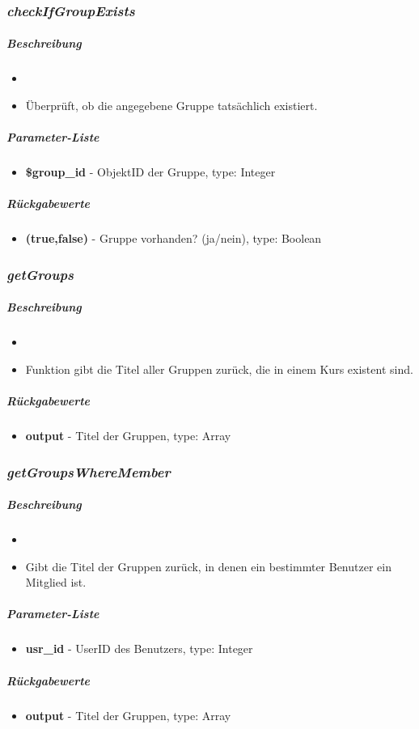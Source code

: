 \subsubsection*{\textit{checkIfGroupExists}}\label{checkIfGroupExistsMGUI}
\subparagraph{Beschreibung}
\begin{itemize}
	\item[] \noindent{} 
	\item[] Überprüft, ob die angegebene Gruppe tatsächlich existiert.
\end{itemize}
\subparagraph{Parameter-Liste}
\begin{itemize}
	\item[] \textbf{\$group\_id} - ObjektID der Gruppe, type: Integer
\end{itemize}
\subparagraph{Rückgabewerte}
\begin{itemize}
	\item[] \textbf{(true,false)} - Gruppe vorhanden? (ja/nein), type: Boolean
\end{itemize}

\subsubsection*{\textit{getGroups}}\label{getGroupsMGUI}
\subparagraph{Beschreibung}
\begin{itemize}
	\item[] \noindent{} 
	\item[] Funktion gibt die Titel aller Gruppen zurück, die in einem Kurs existent sind. 
\end{itemize}
\subparagraph{Rückgabewerte}
\begin{itemize}
	\item[] \textbf{output} - Titel der Gruppen, type: Array
\end{itemize}

\subsubsection*{\textit{getGroupsWhereMember}}\label{getGroupsWhereMemberMGUI}
\subparagraph{Beschreibung}
\begin{itemize}
	\item[] \noindent{} 
	\item[] Gibt die Titel der Gruppen zurück, in denen ein bestimmter Benutzer ein Mitglied ist.
\end{itemize}
\subparagraph{Parameter-Liste}
\begin{itemize}
	\item[] \textbf{usr\_id} - UserID des Benutzers, type: Integer
\end{itemize}
\subparagraph{Rückgabewerte}
\begin{itemize}
	\item[] \textbf{output} - Titel der Gruppen, type: Array
\end{itemize}

